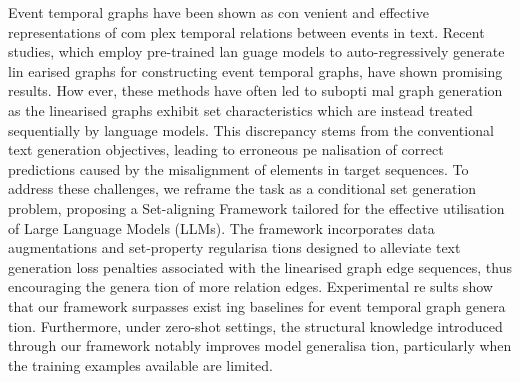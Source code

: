 Event temporal graphs have been shown as con venient and effective representations of com plex temporal relations between events in text.  Recent studies, which employ pre-trained lan guage models to auto-regressively generate lin earised graphs for constructing event temporal  graphs, have shown promising results. How ever, these methods have often led to subopti mal graph generation as the linearised graphs  exhibit set characteristics which are instead  treated sequentially by language models. This  discrepancy stems from the conventional text  generation objectives, leading to erroneous pe nalisation of correct predictions caused by the  misalignment of elements in target sequences.  To address these challenges, we reframe the  task as a conditional set generation problem,  proposing a Set-aligning Framework tailored  for the effective utilisation of Large Language  Models (LLMs). The framework incorporates  data augmentations and set-property regularisa tions designed to alleviate text generation loss  penalties associated with the linearised graph  edge sequences, thus encouraging the genera tion of more relation edges. Experimental re sults show that our framework surpasses exist ing baselines for event temporal graph genera tion. Furthermore, under zero-shot settings, the  structural knowledge introduced through our  framework notably improves model generalisa tion, particularly when the training examples  available are limited.